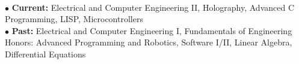 \documentclass[10pt]{article}
\begin{document}
\\
$\bullet$ {\bf Current:} Electrical and Computer Engineering II, Holography, Advanced C Programming, LISP, Microcontrollers\\
$\bullet$ {\bf Past:} Electrical and Computer Engineering I, Fundamentals of Engineering Honors: Advanced Programming and Robotics, Software I/II, Linear Algebra, Differential Equations
\end{document}
